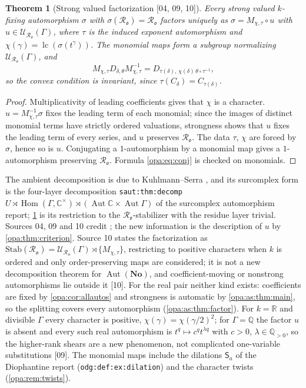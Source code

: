 \documentclass[11pt,oneside]{article}
\numberwithin{equation}{section}
\newtheorem{theorem}{Theorem}[section]
\theoremstyle{definition}
\theoremstyle{remark}
\newcommand{\No}{\mathbf{No}}
\newcommand{\R}{\mathbb R}
\newcommand{\C}{\mathbb C}
\newcommand{\Q}{\mathbb Q}
\newcommand{\oo}{\mathfrak o}
\newcommand{\Ro}{\mathcal R_{\oo}}
\newcommand{\UU}{\mathcal U}
\newcommand{\Aut}{\operatorname{Aut}}
\newcommand{\Hom}{\operatorname{Hom}}
\newcommand{\lc}{\operatorname{lc}}
\newcommand{\src}[1]{\textup{\textsf{\small[#1]}}}
\newcommand{\lbl}[1]{\nolinkurl{#1}}
\begin{document}
\begin{theorem}[Strong valued factorization \src{04, 09, 10}]\label{opa:thm:factorization}
Every strong valued $k$-fixing automorphism $\sigma$ with $\sigma(\Ro)=\Ro$ factors
uniquely as $\sigma=M_{\chi,\tau}\circ u$ with $u\in\UU_{\Ro}(\Gamma)$, where
$\tau$ is the induced exponent automorphism and $\chi(\gamma)=\lc(\sigma(t^\gamma))$.
The monomial maps form a subgroup normalizing $\UU_{\Ro}(\Gamma)$, and
\begin{equation}\label{opa:eq:conj}
 M_{\chi,\tau}D_{\delta,\theta}M_{\chi,\tau}^{-1}=
 D_{\tau(\delta),\,\chi(\delta)\,\theta\circ\tau^{-1}},
\end{equation}
so the convex condition is invariant, since $\tau(C_\delta)=C_{\tau(\delta)}$.
\end{theorem}
\begin{proof}
Multiplicativity of leading coefficients gives that $\chi$ is a character.
$u=M_{\chi,\tau}^{-1}\sigma$ fixes the leading term of each monomial; since the
images of distinct monomial terms have strictly ordered valuations, strongness
shows that $u$ fixes the leading term of every series, and $u$ preserves $\Ro$.
The data $\tau$, $\chi$ are forced by $\sigma$, hence so is $u$. Conjugating a
$1$-automorphism by a monomial map gives a $1$-automorphism preserving $\Ro$.
Formula \eqref{opa:eq:conj} is checked on monomials.
\end{proof}

The ambient decomposition is due to Kuhlmann--Serra \cite{KS}, and its
surcomplex form is the four-layer decomposition \lbl{saut:thm:decomp}
$U\rtimes\Hom(\Gamma,\C^\times)\rtimes(\Aut\C\times\Aut\Gamma)$ of the surcomplex
automorphism report; \cref{opa:thm:factorization} is its restriction to the
$\Ro$-stabilizer with the residue layer trivial. Sources 04, 09 and 10 credit
\cite{KS}; the new information is the description of $u$ by
\cref{opa:thm:criterion}. Source 10 states the factorization as
$\mathrm{Stab}(\Ro)=\UU_{\Ro}(\Gamma)\rtimes\{M_{\chi,\tau}\}$, restricting to
positive characters when $k$ is ordered and only order-preserving maps are
considered; it is not a new decomposition theorem for $\Aut(\No)$, and
coefficient-moving or nonstrong automorphisms lie outside it \src{10}. For the real
pair neither kind exists: coefficients are fixed by \cref{opa:cor:allautos} and
strongness is automatic by \cref{opa:as:thm:main}, so the splitting covers every
automorphism (\cref{opa:as:thm:factor}). For $k=\R$ and divisible $\Gamma$ every character is
positive, $\chi(\gamma)=\chi(\gamma/2)^2$; for $\Gamma=\Q$ the factor $u$ is absent and
every such real automorphism is $t^q\mapsto c^qt^{\lambda q}$ with $c>0$,
$\lambda\in\Q_{>0}$, so the higher-rank shears are a new phenomenon, not
complicated one-variable substitutions \src{09}. The monomial maps include the
dilations $\mathsf S_a$ of the Diophantine report (\lbl{odg:def:ex:dilation}) and
the character twists (\cref{opa:rem:twists}).
\end{document}
